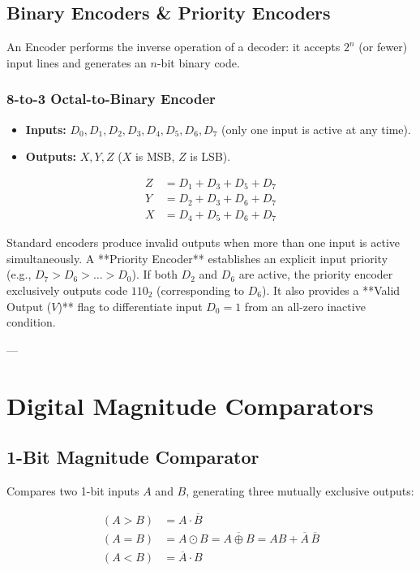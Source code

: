 \subsection{Binary Encoders \& Priority Encoders}
An Encoder performs the inverse operation of a decoder: it accepts $2^n$ (or fewer) input lines and generates an $n$-bit binary code.

\subsubsection{8-to-3 Octal-to-Binary Encoder}
\begin{itemize}
    \item \textbf{Inputs:} $D_0, D_1, D_2, D_3, D_4, D_5, D_6, D_7$ (only one input is active at any time).
    \item \textbf{Outputs:} $X, Y, Z$ ($X$ is MSB, $Z$ is LSB).
\end{itemize}

\begin{keyequation}
\begin{align}
    Z &= D_1 + D_3 + D_5 + D_7 \\
    Y &= D_2 + D_3 + D_6 + D_7 \\
    X &= D_4 + D_5 + D_6 + D_7
\end{align}
\end{keyequation}

\begin{commonmistake}
Standard encoders produce invalid outputs when more than one input is active simultaneously. A **Priority Encoder** establishes an explicit input priority (e.g., $D_7 > D_6 > \dots > D_0$). If both $D_2$ and $D_6$ are active, the priority encoder exclusively outputs code $110_2$ (corresponding to $D_6$). It also provides a **Valid Output ($V$)** flag to differentiate input $D_0 = 1$ from an all-zero inactive condition.
\end{commonmistake}

---

\section{Digital Magnitude Comparators}

\subsection{1-Bit Magnitude Comparator}
Compares two 1-bit inputs $A$ and $B$, generating three mutually exclusive outputs:
\begin{keyequation}
\begin{align}
    (A > B) &= A \cdot \overline{B} \\
    (A = B) &= A \odot B = \overline{A \oplus B} = AB + \overline{A}\,\overline{B} \\
    (A < B) &= \overline{A} \cdot B
\end{align}
\end{keyequation}


